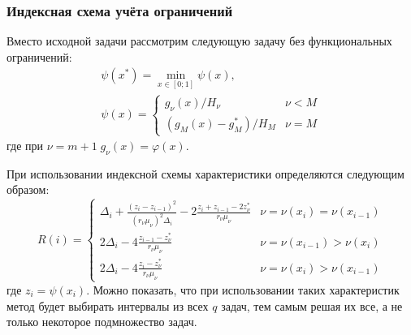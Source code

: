\documentclass[aspectratio=1610]{beamer}
\begin{document}
\begin{frame}
  \frametitle{Индексная схема учёта ограничений}
  Вместо исходной задачи рассмотрим следующую задачу без функциональных ограничений:
  \begin{displaymath}
    \begin{array}{lr}
      \psi (x^{*})=\min_{x\in [0;1]}\psi (x), \\
      \psi (x)={\begin{cases}g_{\nu }(x)/H_{\nu }&\nu <M\\(g_{M}(x)-g_{M}^{*})/H_{M}&\nu =M\end{cases}}
    \end{array}
  \end{displaymath}
  где при \(\nu=m+1\;g_\nu(x)=\varphi(x)\).

  При использовании индексной схемы характеристики определяются следующим образом:
  \begin{displaymath}
    R(i)={\begin{cases}\Delta _{i}+{\frac {(z_{i}-z_{i-1})^{2}}{(r_{\nu }\mu _{\nu })^{2}\Delta _{i}}}-2{\frac {z_{i}+z_{i-1}-2z_{\nu }^{*}}{r_{\nu }\mu _{\nu }}}&\nu =\nu (x_{i})=\nu (x_{i-1})\\2\Delta _{i}-4{\frac {z_{i-1}-z_{\nu }^{*}}{r_{\nu }\mu _{\nu }}}&\nu =\nu (x_{i-1})>\nu (x_{i})\\2\Delta _{i}-4{\frac {z_{i}-z_{\nu }^{*}}{r_{\nu }\mu _{\nu }}}&\nu =\nu (x_{i})>\nu (x_{i-1})\end{cases}}
  \end{displaymath}
  где \(z_i=\psi(x_i)\). Можно показать, что при использовании таких характеристик метод будет выбирать интервалы из всех \(q\) задач, тем самым решая их все, а не только некоторое подмножество задач.
\end{frame}
\end{document}
